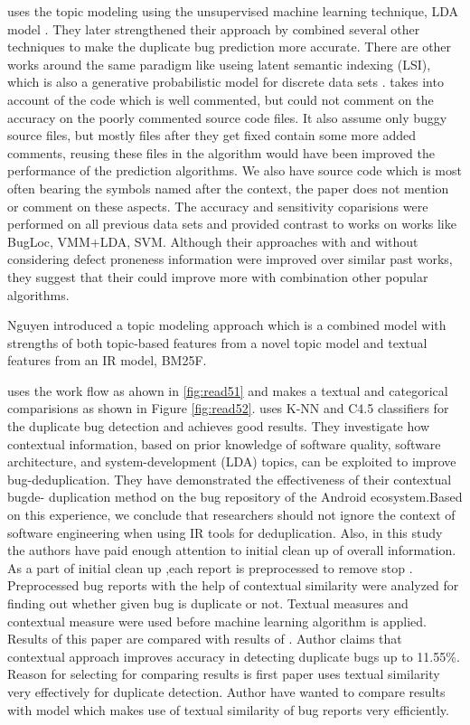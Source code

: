 \documentclass[]{sig-alternate-05-2015}
\begin{document}
\cite{Nguyen} uses the topic modeling using the unsupervised machine learning technique, LDA model \cite{Blei2003}. They later strengthened their approach by combined several other techniques to make the duplicate bug prediction more accurate. There are other works around the same paradigm like useing latent semantic indexing (LSI), which is also a generative probabilistic model for discrete data sets \cite{Marcus2004}. \cite{Nguyen} takes into account of the code which is well commented, but could not comment on the accuracy on the poorly commented source code files. It also assume only buggy source files, but mostly files after they get fixed contain some more added comments, reusing these files in the algorithm would have been improved the performance of the prediction algorithms. We also have source code which is most often bearing the symbols named after the context, the paper does not mention or comment on these aspects. The accuracy and sensitivity coparisions were performed on all previous data sets and provided contrast to works on works like BugLoc, VMM+LDA, SVM. Although their approaches with and without considering defect proneness information were  improved over similar past works, they suggest that their could improve more with combination other popular algorithms. \newline

Nguyen \cite{Nguyen2012} introduced a topic modeling approach which is a combined model with strengths of both topic-based features from a novel topic model and textual features from an IR model, BM25F. \newline

\cite{Alipour2013} uses the work flow as ahown in \ref{fig:read51} and  makes a textual and categorical comparisions as shown in Figure \ref{fig:read52}.  \cite{Alipour2013} uses K-NN and C4.5 classifiers for the duplicate bug detection and achieves good results. They investigate how contextual information, based on prior knowledge of software quality, software architecture, and system-development (LDA)  topics, can be exploited to improve bug-deduplication. They have demonstrated the effectiveness of their contextual bugde- duplication method on the bug repository of the Android ecosystem.Based on this experience, we conclude that researchers should not ignore the context of software engineering when using IR tools for deduplication. Also, in this study the authors have paid enough attention to initial clean up of overall information. As a part of initial clean up ,each report is preprocessed to remove stop . Preprocessed bug reports with the help of contextual similarity were analyzed for finding out whether given bug is duplicate or not. Textual measures and contextual measure were used before machine learning algorithm is applied. Results of this paper are compared with results of \cite{Sun2011} . Author claims that contextual approach improves accuracy in detecting duplicate bugs up to 11.55\%. Reason for selecting \cite{Sun2011} for comparing results is first paper uses textual similarity very effectively for duplicate detection. Author have wanted to compare results with model which makes use of textual similarity of bug reports very efficiently. \newline
\end{document}
